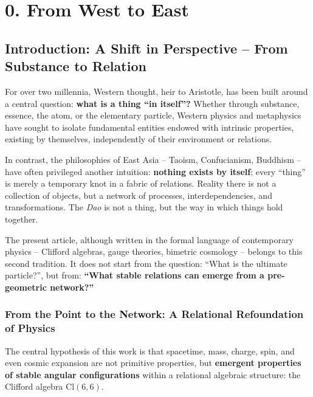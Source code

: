 \documentclass[11pt]{article}
\begin{document}
\clearpage
\pagestyle{fancy}

\hypertarget{from-west-to-east}{%
\section{0. From West to East}\label{from-west-to-east}}

\hypertarget{introduction-a-shift-in-perspective-from-substance-to-relation}{%
\subsection{Introduction: A Shift in Perspective -- From Substance to
Relation}\label{introduction-a-shift-in-perspective-from-substance-to-relation}}

For over two millennia, Western thought, heir to Aristotle, has been
built around a central question: \textbf{what is a thing ``in itself''?}
Whether through substance, essence, the atom, or the elementary
particle, Western physics and metaphysics have sought to isolate
fundamental entities endowed with intrinsic properties, existing by
themselves, independently of their environment or relations.

In contrast, the philosophies of East Asia -- Taoism, Confucianism,
Buddhism -- have often privileged another intuition: \textbf{nothing
exists by itself}; every ``thing'' is merely a temporary knot in a
fabric of relations. Reality there is not a collection of objects, but a
network of processes, interdependencies, and transformations. The
\emph{Dao} is not a thing, but the way in which things hold together.

The present article, although written in the formal language of
contemporary physics -- Clifford algebras, gauge theories, bimetric
cosmology -- belongs to this second tradition. It does not start from
the question: ``What is the ultimate particle?'', but from:
\textbf{``What stable relations can emerge from a pre-geometric
network?''}

\hypertarget{from-the-point-to-the-network-a-relational-refoundation-of-physics}{%
\subsubsection{From the Point to the Network: A Relational Refoundation
of
Physics}\label{from-the-point-to-the-network-a-relational-refoundation-of-physics}}

The central hypothesis of this work is that spacetime, mass, charge,
spin, and even cosmic expansion are not primitive properties, but
\textbf{emergent properties of stable angular configurations} within a
relational algebraic structure: the Clifford algebra
\(\mathrm{Cl}(6,6)\).
\end{document}
